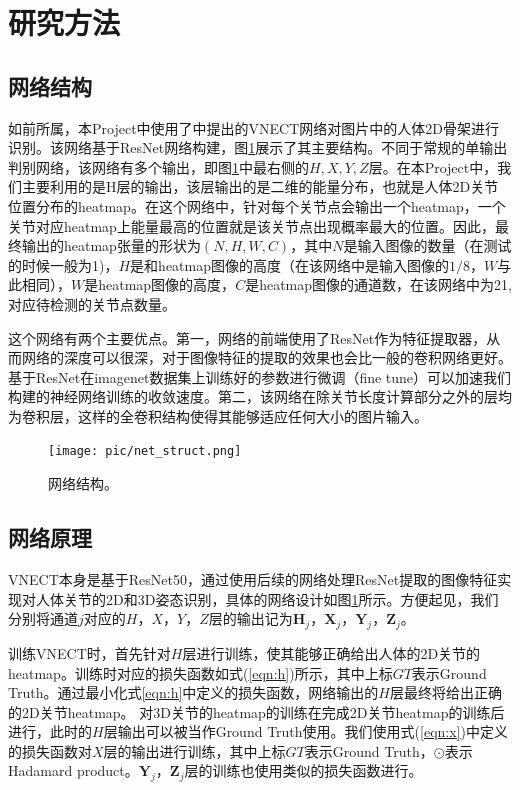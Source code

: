 \documentclass[a4paper, 10pt]{ctexart}
\newcommand{\bX}{\mathbf{X}}
\newcommand{\bY}{\mathbf{Y}}
\newcommand{\bZ}{\mathbf{Z}}
\newcommand{\bH}{\mathbf{H}}
\begin{document}
\section{研究方法}

\subsection{网络结构}

如前所属，本Project中使用了\cite{mehta2017vnect}中提出的VNECT网络对图片中的人体2D骨架进行识别。该网络基于ResNet网络构建，图\ref{pic:net_struct}展示了其主要结构。不同于常规的单输出判别网络，该网络有多个输出，即图\ref{pic:net_struct}中最右侧的$H,X,Y,Z$层。在本Project中，我们主要利用的是H层的输出，该层输出的是二维的能量分布，也就是人体2D关节位置分布的heatmap。在这个网络中，针对每个关节点会输出一个heatmap，一个关节对应heatmap上能量最高的位置就是该关节点出现概率最大的位置。因此，最终输出的heatmap张量的形状为$(N,H,W,C)$，其中$N$是输入图像的数量（在测试的时候一般为1)，$H$是和heatmap图像的高度（在该网络中是输入图像的$1/8$，$W$与此相同），$W$是heatmap图像的高度，$C$是heatmap图像的通道数，在该网络中为21,对应待检测的关节点数量。

这个网络有两个主要优点。第一，网络的前端使用了ResNet\cite{he2016deep}作为特征提取器，从而网络的深度可以很深，对于图像特征的提取的效果也会比一般的卷积网络更好。基于ResNet在imagenet数据集上训练好的参数进行微调（fine tune）可以加速我们构建的神经网络训练的收敛速度。第二，该网络在除关节长度计算部分之外的层均为卷积层，这样的全卷积结构使得其能够适应任何大小的图片输入。

\begin{figure}[ht!]
	\centering                
        \texttt{[image: pic/net\_struct.png]}
        \caption[]{网络结构\footnotemark。\label{pic:net_struct}}
\end{figure}


\subsection{网络原理}
VNECT本身是基于ResNet50，通过使用后续的网络处理ResNet提取的图像特征实现对人体关节的2D和3D姿态识别，具体的网络设计如图\ref{pic:net_struct}所示。方便起见，我们分别将通道$j$对应的$H$，$X$，$Y$，$Z$层的输出记为$\bH_j$，$\bX_j$，$\bY_j$，$\bZ_j$。

训练VNECT时，首先针对$H$层进行训练，使其能够正确给出人体的2D关节的heatmap。训练时对应的损失函数如式(\ref{eqn:h})所示，其中上标$GT$表示Ground Truth。通过最小化式\ref{eqn:h}中定义的损失函数，网络输出的$H$层最终将给出正确的2D关节heatmap。
对3D关节的heatmap的训练在完成2D关节heatmap的训练后进行，此时的$H$层输出可以被当作Ground Truth使用。我们使用式(\ref{eqn:x})中定义的损失函数对$X$层的输出进行训练，其中上标$GT$表示Ground Truth，$\odot$表示Hadamard product。$\bY_j$，$\bZ_j$层的训练也使用类似的损失函数进行。
\end{document}
